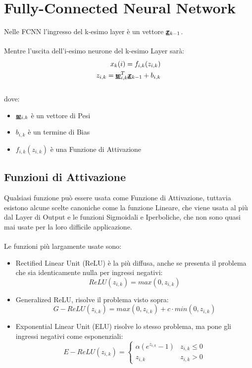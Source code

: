 \section{Fully-Connected Neural Network}
Nelle FCNN l'ingresso del k-esimo layer è un vettore $\pmb{\underline{x}}_{k-1}$.\\ \\
Mentre l'uscita dell'i-esimo neurone del k-esimo Layer sarà:
\begin{equation*}
\begin{aligned}
    x_k (i) = f_{i,k} (z_{i,k}) \\
    z_{i,k} = \pmb{\underline{w}}_{i,k}^T \pmb{\underline{x}}_{k-1} + b_{i,k}
\end{aligned}
\end{equation*}\\
dove:
\begin{itemize}
    \item $\pmb{\underline{w}}_{i,k}$ è un vettore di Pesi
    \item $b_{i,k}$ è un termine di Bias
    \item $f_{i,k} (z_{i,k})$ è una Funzione di Attivazione
\end{itemize}

\subsection{Funzioni di Attivazione}
Qualsiasi funzione può essere usata come Funzione di Attivazione, tuttavia esistono alcune scelte canoniche come la funzione Lineare, che viene usata al più dal Layer di Output e le funzioni Sigmoidali e Iperboliche, che non sono quasi mai usate per la loro difficile applicazione.\\ \\
Le funzioni più largamente usate sono:
\begin{itemize}
    \item Rectified Linear Unit (ReLU) è la più diffusa, anche se presenta il problema che sia identicamente nulla per ingressi negativi:
    \begin{equation*}
        ReLU(z_{i,k}) = max(0, z_{i,k})
    \end{equation*}
    \item Generalized ReLU, risolve il problema visto sopra:
    \begin{equation*}
        G-ReLU(z_{i,k}) = max(0, z_{i,k}) + c \cdot min(0, z_{i,k})
    \end{equation*}
    \item Exponential Linear Unit (ELU) risolve lo stesso problema, ma pone gli ingressi negativi come esponenziali:
    \begin{equation*}
        E-ReLU(z_{i,k}) = \begin{cases}
        \alpha (e^{z_{i,k}} -1) & z_{i,k} \leq 0 \\
        z_{i,k} & z_{i,k} > 0
        \end{cases}
    \end{equation*}
\end{itemize}




